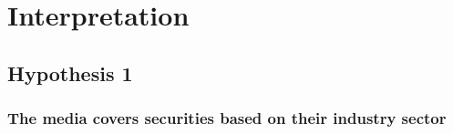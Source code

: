 \chapter{Interpretation}
\label{cha:interpretation}

\section{Hypothesis 1}
\label{cha:hypothesis-1}
\subsection{The media covers securities based on their industry sector}
